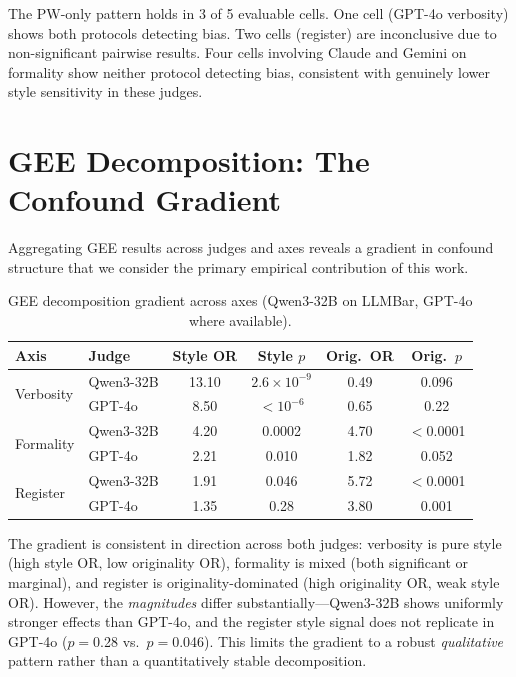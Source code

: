 \documentclass[11pt,a4paper]{article}
\begin{document}
The PW-only pattern holds in 3 of 5 evaluable cells. One cell (GPT-4o verbosity) shows both protocols detecting bias. Two cells (register) are inconclusive due to non-significant pairwise results. Four cells involving Claude and Gemini on formality show neither protocol detecting bias, consistent with genuinely lower style sensitivity in these judges.

\section{GEE Decomposition: The Confound Gradient}

Aggregating GEE results across judges and axes reveals a gradient in confound structure that we consider the primary empirical contribution of this work.

\begin{table}[h]
\centering
\caption{GEE decomposition gradient across axes (Qwen3-32B on LLMBar, GPT-4o where available).}
\label{tab:gee}
\begin{tabular}{llcccc}
\toprule
\textbf{Axis} & \textbf{Judge} & \textbf{Style OR} & \textbf{Style $p$} & \textbf{Orig.\ OR} & \textbf{Orig.\ $p$} \\
\midrule
\multirow{2}{*}{Verbosity} & Qwen3-32B & 13.10 & $2.6 \times 10^{-9}$ & 0.49 & 0.096 \\
& GPT-4o & 8.50 & $<10^{-6}$ & 0.65 & 0.22 \\
\midrule
\multirow{2}{*}{Formality} & Qwen3-32B & 4.20 & 0.0002 & 4.70 & $<$0.0001 \\
& GPT-4o & 2.21 & 0.010 & 1.82 & 0.052 \\
\midrule
\multirow{2}{*}{Register} & Qwen3-32B & 1.91 & 0.046 & 5.72 & $<$0.0001 \\
& GPT-4o & 1.35 & 0.28 & 3.80 & 0.001 \\
\bottomrule
\end{tabular}
\end{table}

The gradient is consistent in direction across both judges: verbosity is pure style (high style OR, low originality OR), formality is mixed (both significant or marginal), and register is originality-dominated (high originality OR, weak style OR). However, the \emph{magnitudes} differ substantially---Qwen3-32B shows uniformly stronger effects than GPT-4o, and the register style signal does not replicate in GPT-4o ($p{=}$0.28 vs.\ $p{=}$0.046). This limits the gradient to a robust \emph{qualitative} pattern rather than a quantitatively stable decomposition.
\end{document}
